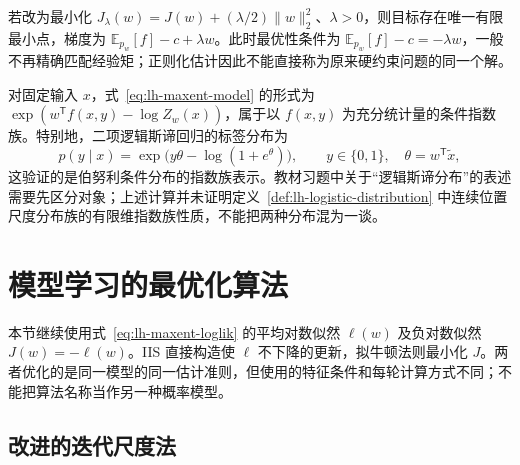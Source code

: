 若改为最小化 $J_\lambda(w)=J(w)+(\lambda/2)\|w\|_2^2$、$\lambda>0$，则目标存在唯一有限最小点，梯度为 $\mathbb E_{p_w}[f]-c+\lambda w$。此时最优性条件为 $\mathbb E_{p_w}[f]-c=-\lambda w$，一般不再精确匹配经验矩；正则化估计因此不能直接称为原来硬约束问题的同一个解。

\begin{remark}
\label{rem:lh-exponential-family}
对固定输入 $x$，式~\eqref{eq:lh-maxent-model} 的形式为 $\exp(w^{\mathsf T}f(x,y)-\log Z_w(x))$，属于以 $f(x,y)$ 为充分统计量的条件指数族。特别地，二项逻辑斯谛回归的标签分布为
\[
p(y\mid x)=\exp\bigl(y\theta-\log(1+e^\theta)\bigr),\qquad
y\in\{0,1\},\quad\theta=w^{\mathsf T}\widetilde x,
\]
这验证的是伯努利条件分布的指数族表示。教材习题中关于“逻辑斯谛分布”的表述需要先区分对象；上述计算并未证明定义~\ref{def:lh-logistic-distribution} 中连续位置尺度分布族的有限维指数族性质，不能把两种分布混为一谈。
\end{remark}

\section{模型学习的最优化算法}
\label{sec:lh-maxent-optimization}

本节继续使用式~\eqref{eq:lh-maxent-loglik} 的平均对数似然 $\ell(w)$ 及负对数似然 $J(w)=-\ell(w)$。IIS 直接构造使 $\ell$ 不下降的更新，拟牛顿法则最小化 $J$。两者优化的是同一模型的同一估计准则，但使用的特征条件和每轮计算方式不同；不能把算法名称当作另一种概率模型。

\subsection{改进的迭代尺度法}
\label{subsec:lh-iis}

